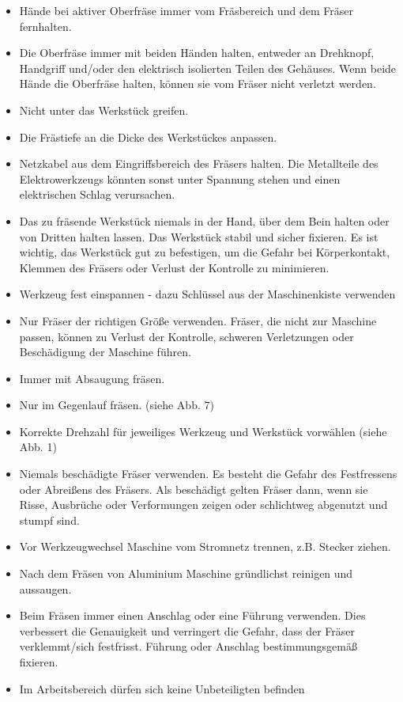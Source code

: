 \documentclass{\basedir/fablab-document}
\begin{document}
\begin{itemize}
\item Hände bei aktiver Oberfräse immer vom Fräsbereich und dem Fräser fernhalten.
\item Die Oberfräse immer mit beiden Händen halten, entweder an Drehknopf, Handgriff und/oder den elektrisch isolierten Teilen des Gehäuses. Wenn beide Hände die Oberfräse halten, können sie vom Fräser nicht verletzt werden.
\item Nicht unter das Werkstück greifen.
\item Die Frästiefe an die Dicke des Werkstückes anpassen.
\item Netzkabel aus dem Eingriffsbereich des Fräsers halten. Die Metallteile des Elektrowerkzeugs könnten sonst unter Spannung stehen und einen elektrischen Schlag verursachen.
\item Das zu fräsende Werkstück niemals in der Hand, über dem Bein halten oder von Dritten halten lassen. Das Werkstück stabil und sicher fixieren. Es ist wichtig, das Werkstück gut zu befestigen, um die Gefahr bei Körperkontakt, Klemmen des Fräsers oder Verlust der Kontrolle zu minimieren.
\item Werkzeug fest einspannen - dazu Schlüssel aus der Maschinenkiste verwenden
\item Nur Fräser der richtigen Größe verwenden. Fräser, die nicht zur Maschine passen, können zu Verlust der Kontrolle, schweren Verletzungen oder Beschädigung der Maschine führen.
\item Immer mit Absaugung fräsen.
\item Nur im Gegenlauf fräsen. (siehe Abb. 7)
\item Korrekte Drehzahl für jeweiliges Werkzeug und Werkstück vorwählen (siehe Abb. 1)
\item Niemals beschädigte Fräser verwenden. Es besteht die Gefahr des Festfressens oder Abreißens des Fräsers. Als beschädigt gelten Fräser dann, wenn sie Risse, Ausbrüche oder Verformungen zeigen oder schlichtweg abgenutzt und stumpf sind.
\item Vor Werkzeugwechsel Maschine vom Stromnetz trennen, z.B. Stecker ziehen.
\item Nach dem Fräsen von Aluminium Maschine gründlichst reinigen und aussaugen.
\item Beim Fräsen immer einen Anschlag oder eine Führung verwenden. Dies verbessert die Genauigkeit und verringert die Gefahr, dass der Fräser verklemmt/sich festfrisst. Führung oder Anschlag bestimmungsgemäß fixieren.
\item Im Arbeitsbereich dürfen sich keine Unbeteiligten befinden
\end{itemize}
\end{document}
